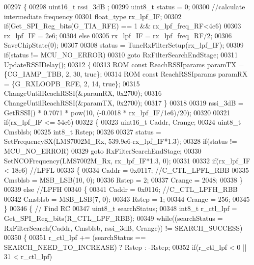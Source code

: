 \begin{DoxyCode}
00297 \{
00298     uint16\_t rssi\_3dB ;
00299     uint8\_t status = 0;
00300     \textcolor{comment}{//calculate intermediate frequency}
00301     float_type rx\_lpf\_IF;
00302     \textcolor{keywordflow}{if}(Get_SPI_Reg_bits(G_TIA_RFE) == 1 && rx\_lpf\_freq\_RF<4e6)
00303         rx\_lpf\_IF = 2e6;
00304     \textcolor{keywordflow}{else}
00305         rx\_lpf\_IF = rx\_lpf\_freq\_RF/2;
00306     SaveChipState(0);
00307 
00308     status = TuneRxFilterSetup(rx\_lpf\_IF);
00309     \textcolor{keywordflow}{if}(status != MCU_NO_ERROR)
00310         \textcolor{keywordflow}{goto} RxFilterSearchEndStage;
00311     UpdateRSSIDelay();
00312     \{
00313     ROM \textcolor{keyword}{const} ReachRSSIparams paramTX = \{CG_IAMP_TBB, 2, 30, \textcolor{keyword}{true}\};
00314     ROM \textcolor{keyword}{const} ReachRSSIparams paramRX = \{G_RXLOOPB_RFE, 2, 14, \textcolor{keyword}{true}\};
00315     ChangeUntilReachRSSI(&paramRX, 0x2700);
00316     ChangeUntilReachRSSI(&paramTX, 0x2700);
00317     \}
00318 
00319     rssi\_3dB = GetRSSI() * 0.7071 * pow(10, (-0.0018 * rx\_lpf\_IF/1e6)/20);
00320 
00321     \textcolor{keywordflow}{if}(rx\_lpf\_IF <= 54e6)
00322     \{
00323         uint16\_t Caddr, Crange;
00324         uint8\_t Cmsblsb;
00325         int8\_t Rstep;
00326 
00327         status = SetFrequencySX(LMS7002M_Rx, 539.9e6-rx\_lpf\_IF*1.3);
00328         \textcolor{keywordflow}{if}(status != MCU_NO_ERROR)
00329             \textcolor{keywordflow}{goto} RxFilterSearchEndStage;
00330         SetNCOFrequency(LMS7002M_Rx, rx\_lpf\_IF*1.3, 0);
00331 
00332         \textcolor{keywordflow}{if}(rx\_lpf\_IF < 18e6) \textcolor{comment}{//LPFL}
00333         \{
00334             Caddr = 0x0117; \textcolor{comment}{//C\_CTL\_LPFL\_RBB}
00335             Cmsblsb = MSB_LSB(10, 0);
00336             Rstep = 2;
00337             Crange = 2048;
00338         \}
00339         \textcolor{keywordflow}{else} \textcolor{comment}{//LPFH}
00340         \{
00341             Caddr = 0x0116; \textcolor{comment}{//C\_CTL\_LPFH\_RBB}
00342             Cmsblsb = MSB_LSB(7, 0);
00343             Rstep = 1;
00344             Crange = 256;
00345         \}
00346         \{ \textcolor{comment}{// Find RC}
00347         uint8\_t searchStatus;
00348         int8\_t r\_ctl\_lpf = Get_SPI_Reg_bits(R_CTL_LPF_RBB);
00349         \textcolor{keywordflow}{while}((searchStatus = RxFilterSearch(Caddr, Cmsblsb, rssi\_3dB, Crange)) != 
      SEARCH_SUCCESS)
00350         \{
00351             r\_ctl\_lpf += (searchStatus == SEARCH_NEED_TO_INCREASE) ? Rstep : -Rstep;
00352             \textcolor{keywordflow}{if}(r\_ctl\_lpf < 0 || 31 < r\_ctl\_lpf)

\end{DoxyCode}
